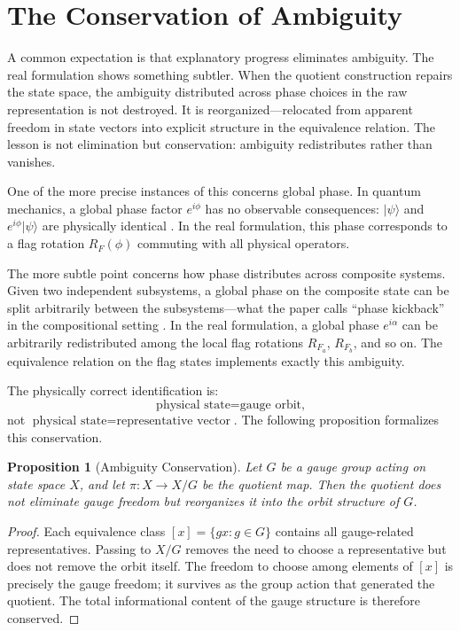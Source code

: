 \documentclass[12pt]{article}
\newtheorem{proposition}[theorem]{Proposition}
\begin{document}
\section{The Conservation of Ambiguity}

A common expectation is that explanatory progress eliminates ambiguity. The real formulation shows something subtler. When the quotient construction repairs the state space, the ambiguity distributed across phase choices in the raw representation is not destroyed. It is reorganized---relocated from apparent freedom in state vectors into explicit structure in the equivalence relation. The lesson is not elimination but conservation: ambiguity redistributes rather than vanishes.

One of the more precise instances of this concerns global phase. In quantum mechanics, a global phase factor $e^{i\phi}$ has no observable consequences: $|\psi\rangle$ and $e^{i\phi}|\psi\rangle$ are physically identical \cite{Dirac,VonNeumann}. In the real formulation, this phase corresponds to a flag rotation $R_F(\phi)$ commuting with all physical operators.

The more subtle point concerns how phase distributes across composite systems. Given two independent subsystems, a global phase on the composite state can be split arbitrarily between the subsystems---what the paper calls ``phase kickback'' in the compositional setting \cite{Barrios}. In the real formulation, a global phase $e^{i\alpha}$ can be arbitrarily redistributed among the local flag rotations $R_{F_a}$, $R_{F_b}$, and so on. The equivalence relation on the flag states implements exactly this ambiguity.

The physically correct identification is:
\[
\text{physical state} = \text{gauge orbit,}
\]
not $\text{physical state} = \text{representative vector}$. The following proposition formalizes this conservation.

\begin{proposition}[Ambiguity Conservation]
\label{prop:ambig}
Let $G$ be a gauge group acting on state space $X$, and let $\pi\colon X \to X/G$ be the quotient map. Then the quotient does not eliminate gauge freedom but reorganizes it into the orbit structure of $G$.
\end{proposition}

\begin{proof}
Each equivalence class $[x] = \{gx : g \in G\}$ contains all gauge-related representatives. Passing to $X/G$ removes the need to choose a representative but does not remove the orbit itself. The freedom to choose among elements of $[x]$ is precisely the gauge freedom; it survives as the group action that generated the quotient. The total informational content of the gauge structure is therefore conserved.
\end{proof}
\end{document}
